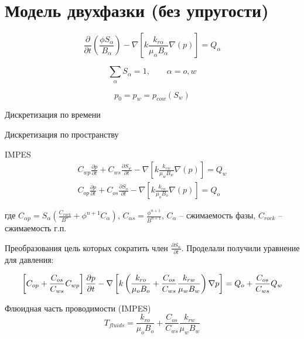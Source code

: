 \documentclass[14pt]{article}
\begin{document}
\section{Модель двухфазки (без упругости)}

	\begin{equation}
		\frac{\partial}{\partial t} \left( \frac{\phi S_{\alpha}}{B_{\alpha}} \right) - \nabla \left[ k \frac{k_{r \alpha}}{\mu_{\alpha} B_{\alpha}} \nabla \left( p \right) \right] = Q_{\alpha}
	\end{equation}
	
	\begin{equation}
		\sum_{\alpha} S_{\alpha} = 1, \qquad \alpha = o,w
	\end{equation}
	
	\begin{equation}
		p_{0} = p_{w} = p_{cow}(S_{w})
	\end{equation}
	
	Дискретизация по времени
	
	
	Дискретизация по пространству
	
	
	IMPES
	\begin{eqnarray}
		C_{wp} \frac{\partial p}{\partial t} +
		C_{ws} \frac{\partial S_{w}}{\partial t} -
		\nabla \left[ k \frac{k_{rw}}{\mu_{w} B_{w}} \nabla \left( p \right) \right] = Q_{w} \\
		C_{op} \frac{\partial p}{\partial t} +
		C_{os} \frac{\partial S_{o}}{\partial t} -
		\nabla \left[ k \frac{k_{ro}}{\mu_{o} B_{o}} \nabla \left( p \right) \right] = Q_{o}	
	\end{eqnarray}
	
	
	где $C_{\alpha p} = S_{\alpha} \left( \frac{C_{rock}}{B^{n}} + \phi^{n+1} C_{\alpha} \right)$, $C_{\alpha s} = \frac{\phi^{n+1}}{B^{n+1}}$, $C_{\alpha}$ -- сжимаемость фазы, $C_{rock}$ -- сжимаемость г.п.

	Преобразования цель которых сократить член $\frac{\partial S_{\alpha}}{\partial t}$. Проделали получили уравнение для давления:
	
	\begin{equation}
		\left[ C_{op} + \frac{C_{os}}{C_{ws}} C_{wp} \right] \frac{\partial p}{\partial t} -
		\nabla \left[ k \left( \frac{k_{ro}}{\mu_{o} B_{o}} + \frac{C_{os}}{C_{ws}} \frac{k_{rw}}{\mu_{w} B_{w}} \right) \nabla p  \right] = Q_{o} + \frac{C_{os}}{C_{ws}} Q_{w} \\
	\end{equation}
	
	Флюидная часть проводимости (IMPES)
	\begin{equation}
		T_{fluids} = \frac{k_{ro}}{\mu_{o} B_{o}} + \frac{C_{os}}{C_{ws}} \frac{k_{rw}}{\mu_{w} B_{w}}
	\end{equation}
	
\end{document}
